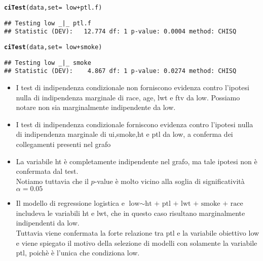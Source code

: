 \documentclass{article}\usepackage[]{graphicx}\usepackage[]{color}
\makeatletter
\newcommand{\hlopt}[1]{\textcolor[rgb]{0,0,0}{#1}}%
\newcommand{\hlstd}[1]{\textcolor[rgb]{0.345,0.345,0.345}{#1}}%
\newcommand{\hlkwc}[1]{\textcolor[rgb]{0.333,0.667,0.333}{#1}}%
\newcommand{\hlkwd}[1]{\textcolor[rgb]{0.737,0.353,0.396}{\textbf{#1}}}%
\newenvironment{kframe}{%
 \def\at@end@of@kframe{}%
 \ifinner\ifhmode%
  \def\at@end@of@kframe{\end{minipage}}%
  \begin{minipage}{\columnwidth}%
 \fi\fi%
 \def\FrameCommand##1{\hskip\@totalleftmargin \hskip-\fboxsep
 \colorbox{shadecolor}{##1}\hskip-\fboxsep
     \hskip-\linewidth \hskip-\@totalleftmargin \hskip\columnwidth}%
 \MakeFramed {\advance\hsize-\width
   \@totalleftmargin\z@ \linewidth\hsize
   \@setminipage}}%
 {\par\unskip\endMakeFramed%
 \at@end@of@kframe}
\newenvironment{knitrout}{}{} %
\makeatother
\begin{document}
\begin{knitrout}
\begin{kframe}
\begin{alltt}
\hlkwd{ciTest}\hlstd{(data,}\hlkwc{set}\hlstd{=}\hlopt{~}\hlstd{low} \hlopt{+} \hlstd{ptl.f)}
\end{alltt}
\begin{verbatim}
## Testing low _|_ ptl.f 
## Statistic (DEV):   12.774 df: 1 p-value: 0.0004 method: CHISQ
\end{verbatim}
\begin{alltt}
\hlkwd{ciTest}\hlstd{(data,}\hlkwc{set}\hlstd{=}\hlopt{~}\hlstd{low} \hlopt{+} \hlstd{smoke)}
\end{alltt}
\begin{verbatim}
## Testing low _|_ smoke 
## Statistic (DEV):    4.867 df: 1 p-value: 0.0274 method: CHISQ
\end{verbatim}
\end{kframe}
\end{knitrout}

\begin{itemize}
\item I test di indipendenza condizionale non forniscono evidenza contro l'ipotesi nulla di indipendenza marginale di race, age, lwt e ftv da low. Possiamo notare non sia marginalmente indipendente da low.
\item I test di indipendenza condizionale forniscono evidenza contro l'ipotesi nulla di indipendenza marginale di ui,smoke,ht e ptl da low, a conferma dei collegamenti presenti nel grafo
\item La variabile ht è completamente indipendente nel grafo, ma tale ipotesi non è confermata dal test.\\ Notiamo tuttavia che il $p$-value è molto vicino alla soglia di significatività $\alpha=0.05$
\item Il modello di regressione logistica e $\text{low} \sim \text{ht + ptl + lwt + smoke + race}$ includeva le variabili ht e lwt, che in questo caso risultano marginalmente indipendenti da low.
\\Tuttavia viene confermata la forte relazione tra ptl e la variabile obiettivo low e viene spiegato il motivo della selezione di modelli con solamente la variabile ptl, poichè è l'unica che condiziona low.
\end{itemize}
\end{document}
